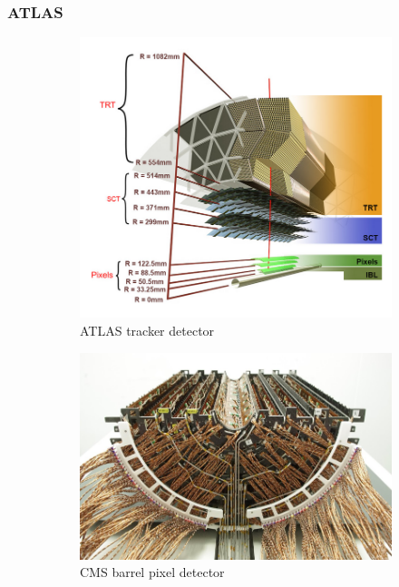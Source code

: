     \subsubsection{ATLAS}    
        \begin{figure}
                \centering
                \begin{subfigure}[b]{0.49\textwidth}
                    \centering
                    \includegraphics[width=\linewidth]{figures/pixel_detectors_usage/ATLAS.png}                
                    \caption{ATLAS tracker detector}
                    \label{fig:ATLAS}
                \end{subfigure}
                \hfill
                \begin{subfigure}[b]{0.49\textwidth}
                    \centering
                    \includegraphics[width=\linewidth]{figures/pixel_detectors_usage/cms.png} 
                    \caption{CMS barrel pixel detector}
                    \label{fig:CMS}
                \end{subfigure}
                \caption{}
                \label{fig:ATLAS_CMS}
        \end{figure}
